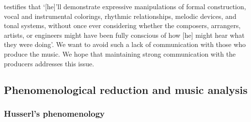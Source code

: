 \documentclass{article}
\begin{document}
\citet[p.~271]{everett2000expression} testifies that `[he]'ll demonstrate expressive manipulations of formal construction, vocal and instrumental colorings, rhythmic relationships, melodic devices, and tonal systems, without once ever considering whether the composers, arrangers, artists, or engineers might have been fully conscious of how [he] might hear what they were doing'. We want to avoid such a lack of communication with those who produce the music. We hope that maintaining strong communication with the producers addresses this issue.



\subsection{Phenomenological reduction and music analysis}\label{ref:phenomenologicalreduction}

\subsubsection{Husserl's phenomenology}
\end{document}
